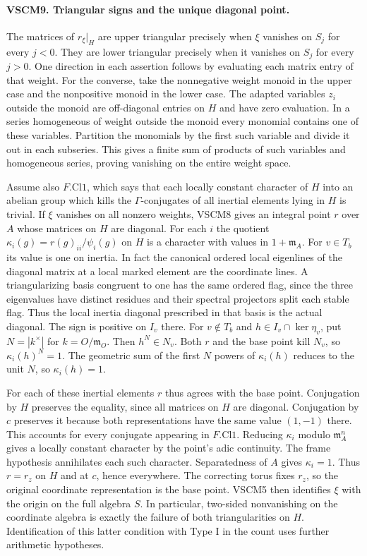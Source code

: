 \paragraph{VSCM9. Triangular signs and the unique diagonal point.}
\label{claim:VSCM9}
The matrices of $r_\xi|_H$ are upper triangular precisely when
$\xi$ vanishes on $S_j$ for every $j<0$. They are lower triangular
precisely when it vanishes on $S_j$ for every $j>0$. One direction
in each assertion follows by evaluating each matrix entry of that
weight. For the converse, take the nonnegative weight monoid in
the upper case and the nonpositive monoid in the lower case. The
adapted variables $z_i$ outside the monoid are off-diagonal entries
on $H$ and have zero evaluation. In a series homogeneous of
weight outside the monoid every monomial contains one of these
variables. Partition the monomials by the first such variable and
divide it out in each subseries. This gives a finite sum of products
of such variables and homogeneous series, proving vanishing on the
entire weight space.

Assume also $F.\mathrm{Cl1}$, which says that each locally constant character of $H$
into an abelian group which kills the $\Gamma$-conjugates of all
inertial elements lying in $H$ is trivial. If $\xi$ vanishes on
all nonzero weights, VSCM8 gives an integral point $r$ over $A$ whose
matrices on $H$ are diagonal. For each $i$ the quotient
$\kappa_i(g)=r(g)_{ii}/\psi_i(g)$ on $H$ is a character with values
in $1+\mathfrak m_A$. For $v\in T_b$ its value is one on inertia. In fact the canonical ordered local eigenlines of the diagonal matrix at a
local marked element are the coordinate lines. A triangularizing
basis congruent to one has the same ordered flag, since the three
eigenvalues have distinct residues and their spectral projectors
split each stable flag. Thus the local inertia diagonal prescribed
in that basis is the actual diagonal. The sign is positive on
$I_v$ there. For $v\notin T_b$ and $h\in I_v\cap\ker\eta_v$, put
$N=|k^\times|$ for $k=O/\mathfrak m_O$. Then $h^N\in N_v$.
Both $r$ and the base point kill $N_v$, so $\kappa_i(h)^N=1$.
The geometric sum of the first $N$ powers of $\kappa_i(h)$ reduces
to the unit $N$, so $\kappa_i(h)=1$.

For each of these inertial elements $r$ thus agrees with the base
point. Conjugation by $H$ preserves the equality, since all matrices
on $H$ are diagonal. Conjugation by $c$ preserves it because both
representations have the same value $(1,-1)$ there. This accounts
for every conjugate appearing in $F.\mathrm{Cl1}$. Reducing
$\kappa_i$ modulo $\mathfrak m_A^n$ gives a locally constant
character by the point's adic continuity. The frame hypothesis
annihilates each such character. Separatedness of $A$ gives
$\kappa_i=1$. Thus $r=r_z$ on $H$ and at $c$, hence everywhere.
The correcting torus fixes $r_z$, so the original coordinate
representation is the base point. VSCM5 then identifies $\xi$ with
the origin on the full algebra $S$. In particular, two-sided
nonvanishing on the coordinate algebra is exactly the failure of
both triangularities on $H$. Identification of this latter condition
with Type I in the count uses further arithmetic hypotheses.

